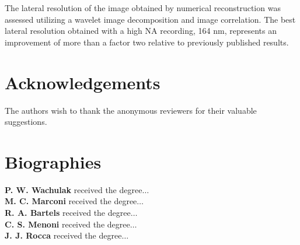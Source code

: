 \documentclass[]{IEEEphot}
\begin{document}
The lateral resolution of the image obtained by numerical reconstruction was assessed utilizing a wavelet image decomposition and image correlation. The best lateral resolution obtained with a high NA recording, 164 nm, represents an improvement of more than a factor two relative to previously published results.     

\section*{Acknowledgements}
The authors wish to thank the anonymous reviewers for their valuable suggestions.  


\section*{Biographies}

\textbf{P. W. Wachulak} received the degree${\ldots}$ \\[6pt]
\textbf{M. C. Marconi} received the degree${\ldots}$ \\[6pt]
\textbf{R. A. Bartels} received the degree${\ldots}$ \\[6pt]
\textbf{C. S. Menoni} received the degree${\ldots}$ \\[6pt]
\textbf{J. J. Rocca} received the degree${\ldots}$
\end{document}
